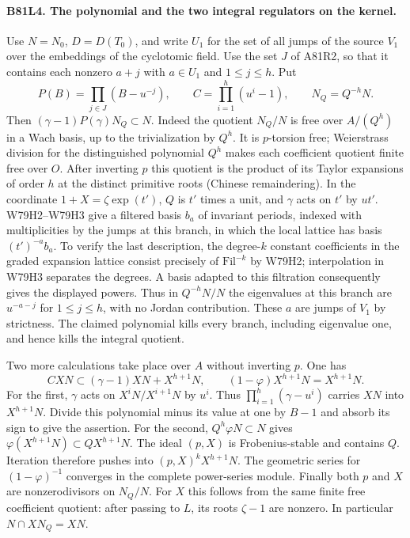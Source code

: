 \paragraph{B81L4. The polynomial and the two integral regulators on the kernel.}
Use $N=N_0$, $D=D(T_0)$, and write $U_1$ for the set of all
jumps of the source $V_1$ over the embeddings of the cyclotomic
field. Use the set $J$ of A81R2, so that it contains each nonzero
$a+j$ with $a\in U_1$ and $1\le j\le h$. Put
\[
 P(B)=\prod_{j\in J}(B-u^{-j}),\qquad
 C=\prod_{i=1}^{h}(u^i-1),\qquad N_Q=Q^{-h}N.
\]
Then $(\gamma-1)P(\gamma)N_Q\subset N$. Indeed the quotient
$N_Q/N$ is free over $A/(Q^h)$ in a Wach basis, up to the
trivialization by $Q^h$. It is $p$-torsion free; Weierstrass
division for the distinguished polynomial $Q^h$ makes each
coefficient quotient finite free over $O$. After inverting $p$
this quotient is the product of its Taylor expansions of order
$h$ at the distinct primitive roots (Chinese remaindering).
In the coordinate $1+X=\zeta\exp(t')$, $Q$ is $t'$ times a
unit, and $\gamma$ acts on $t'$ by $u t'$. W79H2--W79H3 give
a filtered basis $b_a$ of invariant periods, indexed with
multiplicities by the jumps at this branch, in which the local
lattice has basis $(t')^{-a}b_a$. To verify the last description,
the degree-$k$ constant coefficients in the graded expansion
lattice consist precisely of $\mathrm{Fil}^{-k}$ by W79H2;
interpolation in W79H3 separates the degrees. A basis adapted
to this filtration consequently gives the displayed powers.
Thus in $Q^{-h}N/N$ the eigenvalues at this branch are
$u^{-a-j}$ for $1\le j\le h$, with no Jordan contribution.
These $a$ are jumps of $V_1$ by strictness. The claimed
polynomial kills every branch, including eigenvalue one, and
hence kills the integral quotient.

Two more calculations take place over $A$ without inverting $p$.
One has
\[
 C XN\subset(\gamma-1)XN+X^{h+1}N,
 \qquad (1-\varphi)X^{h+1}N=X^{h+1}N.
\]
For the first, $\gamma$ acts on $X^iN/X^{i+1}N$ by $u^i$.
Thus $\prod_{i=1}^h(\gamma-u^i)$ carries $XN$ into
$X^{h+1}N$. Divide this polynomial minus its value at one by
$B-1$ and absorb its sign to give the assertion. For the second,
$Q^h\varphi N\subset N$ gives
$\varphi(X^{h+1}N)\subset QX^{h+1}N$. The ideal $(p,X)$ is
Frobenius-stable and contains $Q$. Iteration therefore pushes
into $(p,X)^kX^{h+1}N$. The geometric series for $(1-\varphi)^{-1}$
converges in the complete power-series module. Finally both $p$
and $X$ are nonzerodivisors on $N_Q/N$. For $X$ this follows
from the same finite free coefficient quotient: after passing to
$L$, its roots $\zeta-1$ are nonzero. In particular
$N\cap XN_Q=XN$.

